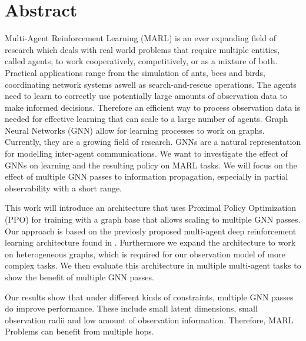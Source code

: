 
\chapter*{Abstract}

Multi-Agent Reinforcement Learning (MARL) is an ever expanding field of research which deals with real world problems that require multiple entities, called agents, to work cooperatively, competitively, or as a mixture of both. Practical applications range from the simulation of ants, bees and birds, coordinating network systems aswell as search-and-rescue operations. The agents need to learn to correctly use potentially large amounts of observation data to make informed decisions. Therefore an efficient way to process observation data is needed for effective learning that can scale to a large number of agents. Graph Neural Networks (GNN) allow for learning processes to work on graphs. Currently, they are a growing field of research. GNNs are a natural representation for modelling inter-agent communications. We want to investigate the effect of GNNs on learning and the resulting policy on MARL tasks. We will focus on the effect of multiple GNN passes to information propagation, especially in partial observability with a short range.\par

This work will introduce an architecture that uses Proximal Policy Optimization (PPO) for training with a graph base that allows scaling to multiple GNN passes. Our approach is based on the previosly proposed multi-agent deep reinforcement learning architecture found in \citet{RobinRuede2021}. Furthermore we expand the architecture to work on heterogeneous graphs, which is required for our observation model of more complex tasks. We then evaluate this architecture in multiple multi-agent tasks to show the benefit of multiple GNN passes. 
\par

Our results show that under different kinds of constraints, multiple GNN passes do improve performance. These include small latent dimensions, small observation radii and low amount of observation information. Therefore, MARL Problems can benefit from multiple hops.

